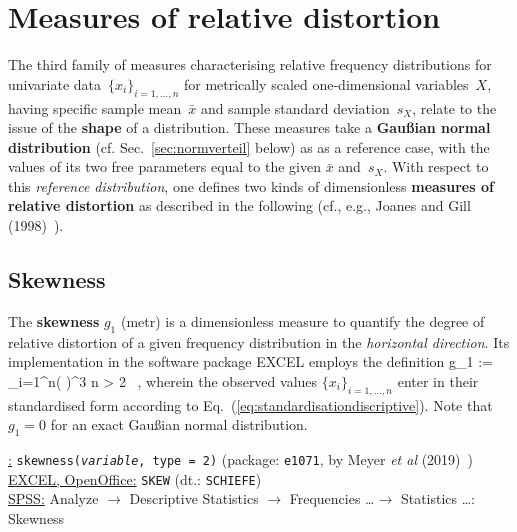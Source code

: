 \section[Measures of relative distortion]{Measures of relative
distortion}
The third family of measures characterising relative frequency 
distributions for univariate data~$\{x_{i}\}_{i=1,\ldots,n}$ for 
metrically scaled one-dimensional variables~$X$, having specific 
sample mean~$\bar{x}$ and sample standard deviation~$s_{X}$, 
relate to the issue of the \textbf{shape} of a distribution. These 
measures take a \textbf{Gau\ss ian normal distribution} (cf. 
Sec.~\ref{sec:normverteil} below) as as a reference case, with the
values of its two free parameters equal to the given $\bar{x}$
and~$s_{X}$. With respect to this \textit{reference distribution},
one defines two kinds of dimensionless \textbf{measures of relative
distortion} as described in the following (cf., e.g., Joanes and
Gill (1998)~).

\subsection[Skewness]{Skewness}
The \textbf{skewness} $g_{1}$ (metr) is a dimensionless measure to 
quantify the degree of relative distortion of a given frequency
distribution in the \textit{horizontal direction}. Its 
implementation in the software package EXCEL employs the definition
%
\be
{}
g_{1} := 
\sum_{i=1}^{n}\left(
\right)^{3}
\qquad{}\quad n > 2 \ ,
\ee
%
wherein the observed values $\{x_{i}\}_{i=1,\ldots,n}$ enter in 
their standardised form according to 
Eq.~(\ref{eq:standardisationdiscriptive}). Note that $g_{1}=0$ for 
an exact Gau\ss ian normal distribution.

\medskip
\noindent
\underline{\R:} \texttt{skewness(\textit{variable},
type = 2)} (package: \texttt{e1071}, by Meyer \textit{et al}
(2019)~) \\
\underline{EXCEL, OpenOffice:} \texttt{SKEW} (dt.:
\texttt{SCHIEFE}) \\
\underline{SPSS:} Analyze $\rightarrow$ Descriptive Statistics
$\rightarrow$ Frequencies \ldots $\rightarrow$ Statistics
\ldots: Skewness

